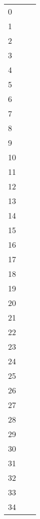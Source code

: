 \documentclass{article}
\begin{document}
\nocite{Xu2015ShowAA}
\nocite{Deng2017ImagetoMarkupGW}
\nocite{Bluche2014ACO}




\appendix
\begin{figure*}[p]
	\begin{tabular}{lll}
		&  &  \\
		\hline
		\scriptsize{0} &  & \\
\scriptsize{1} &  & \\
\scriptsize{2} &  & \\
\scriptsize{3} &  & \\
\scriptsize{4} &  & \\
\scriptsize{5} &  & \\
\scriptsize{6} &  & \\
\scriptsize{7} &  & \\
\scriptsize{8} &  & \\
\scriptsize{9} &  & \\
\scriptsize{10} &  & \\
\scriptsize{11} &  & \\
\scriptsize{12} &  & \\
\scriptsize{13} &  & \\
\scriptsize{14} &  & \\
\scriptsize{15} &  & \\
\scriptsize{16} &  & \\
\scriptsize{17} &  & \\
\scriptsize{18} &  & \\
\scriptsize{19} &  & \\
\scriptsize{20} &  & \\
\scriptsize{21} &  & \\
\scriptsize{22} &  & \\
\scriptsize{23} &  & \\
\scriptsize{24} &  & \\
\scriptsize{25} &  & \\
\scriptsize{26} &  & \\
\scriptsize{27} &  & \\
\scriptsize{28} &  & \\
\scriptsize{29} &  & \\
\scriptsize{30} &  & \\
\scriptsize{31} &  & \\
\scriptsize{32} &  & \\
\scriptsize{33} &  & \\
\scriptsize{34} &  & \\

\end{tabular}
\end{figure*}
\end{document}
